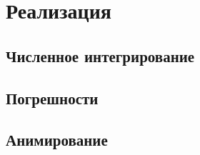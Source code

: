 \chapter{Реализация}
\section{Численное интегрирование}
\section{Погрешности}
\section{Анимирование}

